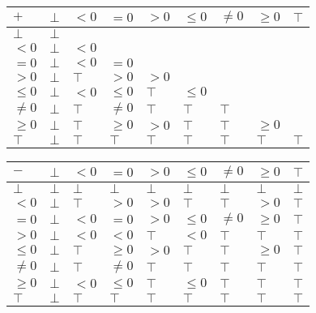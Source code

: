 \documentclass{article}
\begin{document}
\begin{table}[]
    \begin{tabular}{|l|l|l|l|l|l|l|l|l|}
    \hline
    $+$     & $\bot$ & $<0$   & $=0$    & $>0$   & $\le 0$ & $\ne 0$ & $\ge 0$ & $\top$ \\ \hline
    $\bot$  & $\bot$ &        &         &        &         &         &         &        \\ \hline
    $<0$    & $\bot$ & $<0$   &         &        &         &         &         &        \\ \hline
    $=0$    & $\bot$ & $<0$   & $=0$    &        &         &         &         &        \\ \hline
    $>0$    & $\bot$ & $\top$ & $>0$    & $>0$   &         &         &         &        \\ \hline
    $\le 0$ & $\bot$ & $<0$   & $\le 0$ & $\top$ & $\le 0$ &         &         &        \\ \hline
    $\ne 0$ & $\bot$ & $\top$ & $\ne 0$ & $\top$ & $\top$  & $\top$  &         &        \\ \hline
    $\ge 0$ & $\bot$ & $\top$ & $\ge 0$ & $>0$   & $\top$  & $\top$  & $\ge 0$ &        \\ \hline
    $\top$  & $\bot$ & $\top$ & $\top$  & $\top$ & $\top$  & $\top$  & $\top$  & $\top$ \\ \hline
    \end{tabular}
    \end{table}

    \begin{table}[]
        \begin{tabular}{|l|l|l|l|l|l|l|l|l|}
        \hline
        $-$     & $\bot$ & $<0$   & $=0$    & $>0$   & $\le 0$ & $\ne 0$ & $\ge 0$ & $\top$ \\ \hline
        $\bot$  & $\bot$ & $\bot$ & $\bot$  & $\bot$ & $\bot$  & $\bot$  & $\bot$  & $\bot$ \\ \hline
        $<0$    & $\bot$ & $\top$ & $>0$    & $>0$   & $\top$  & $\top$  & $>0$    & $\top$ \\ \hline
        $=0$    & $\bot$ & $<0$   & $=0$    & $>0$   & $\le 0$ & $\ne 0$ & $\ge 0$ & $\top$ \\ \hline
        $>0$    & $\bot$ & $<0$   & $<0$    & $\top$ & $<0$    & $\top$  & $\top$  & $\top$ \\ \hline
        $\le 0$ & $\bot$ & $\top$ & $\ge 0$ & $>0$   & $\top$  & $\top$  & $\ge 0$ & $\top$ \\ \hline
        $\ne 0$ & $\bot$ & $\top$ & $\ne 0$ & $\top$ & $\top$  & $\top$  & $\top$  & $\top$ \\ \hline
        $\ge 0$ & $\bot$ & $<0$   & $\le 0$ & $\top$ & $\le 0$ & $\top$  & $\top$  & $\top$ \\ \hline
        $\top$  & $\bot$ & $\top$ & $\top$  & $\top$ & $\top$  & $\top$  & $\top$  & $\top$ \\ \hline
        \end{tabular}
        \end{table}
\end{document}
